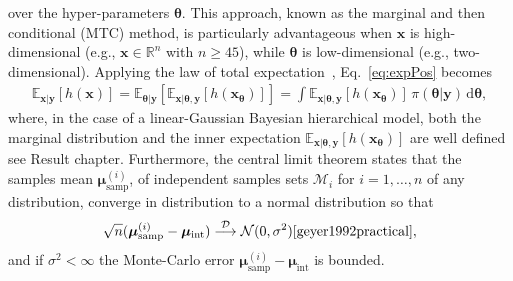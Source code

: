 over the hyper-parameters $\bm{\theta}$.
This approach, known as the marginal and then conditional (MTC) method, is particularly advantageous when $\bm{x}$ is high-dimensional (e.g., $\bm{x} \in \mathbb{R}^n$ with $n \geq 45$), while $\bm{\theta}$ is low-dimensional (e.g., two-dimensional).
Applying the law of total expectation~\cite{champ2022generalizedlawtotalcovariance}, Eq.~\eqref{eq:expPos} becomes
\begin{align}
	\mathbb{E}_{\bm{x} |  \bm{y}} [h(\bm{x})] 
	= \mathbb{E}_{\bm{\theta} |  \bm{y}} \left[ \mathbb{E}_{\bm{x} |  \bm{\theta}, \bm{y}} [h(\bm{x}_{\bm{\theta}})] \right] 
	= \int \mathbb{E}_{\bm{x} |  \bm{\theta}, \bm{y}} \left[ h(\bm{x}_{\bm{\theta}}) \right] \, \pi(\bm{\theta} |  \bm{y}) \, \mathrm{d}\bm{\theta},
	\label{eq:fullCond}
\end{align}
where, in the case of a linear-Gaussian Bayesian hierarchical model, both the marginal distribution and the inner expectation $\mathbb{E}_{\bm{x} |  \bm{\theta}, \bm{y}} \left[ h(\bm{x}_{\bm{\theta}}) \right]$ are well defined see Result chapter.
Furthermore, the central limit theorem states that the samples mean $ \bm{\mu}^{(i)}_{\text{samp}} $, of independent samples sets $\mathcal{M}_i$ for $i = 1, \dots, n$ of any distribution, converge in distribution to a normal distribution so that
\begin{align}
	\sqrt{n} (\bm{\mu}^{(i)}_{\text{samp}} -  \bm{\mu}_{\text{int}} ) \overset{\mathcal{D}}{\longrightarrow} \mathcal{N} (0,\sigma^2) \text{\cite{geyer1992practical}},
\end{align}
and if $\sigma^2 < \infty$ the Monte-Carlo error $\bm{\mu}^{(i)}_{\text{samp}} -  \bm{\mu}_{\text{int}} $ is bounded.


